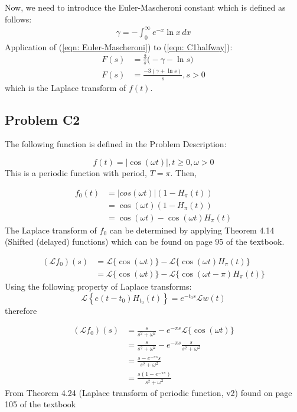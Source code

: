 \documentclass[a4paper,10pt,reqno]{amsart}
\numberwithin{equation}{section}
\newcommand{\lap}{\mathscr{L}}
\begin{document}
Now, we need to introduce the Euler-Mascheroni constant which is defined as follows:
\begin{align}
\gamma = -\int_{0}^{\infty} e^{-x} \ln x \,dx \label{eqn: Euler-Mascheroni}
\end{align}
Application of (\ref{eqn: Euler-Mascheroni}) to (\ref{eqn: C1halfway}):
\begin{align}
F(s) &= \frac{3}{s} \bigg( -\gamma - \ln s \bigg) \nonumber \\
F(s) &= \frac{-3(\gamma + \ln s)}{s}, s>0 \label{eqn: C1final}
\end{align}
which is the Laplace transform of $f(t)$.


\subsection{Problem C2}\label{sec:c2}

The following function is defined in the Problem Description:

\begin{equation}
    f(t) = |\cos(\omega t)|, t \geq 0, \omega > 0
\end{equation}
This is a periodic function with period, $T = \pi$. Then, 

\begin{align}
f_0(t) &= |cos(\omega t)|(1 - H_\pi(t)) \\
&= \cos(\omega t)(1 - H_\pi(t)) \\
&= \cos(\omega t) - \cos(\omega t)H_\pi(t)
\end{align}
The Laplace transform of $f_0$ can be determined by applying Theorem 4.14 (Shifted (delayed) functions) which can be found on page 95 of the textbook.

\begin{align}
(\lap f_0)(s) &= \lap\{\cos(\omega t)\} - \lap\{\cos(\omega t)H_\pi(t)\} \\
&= \lap\{\cos(\omega t)\} - \lap\{\cos(\omega t - \pi)H_\pi(t)\}
\end{align}
Using the following property of Laplace transforms:
\begin{equation}
    \lap\left\{e(t - t_0)H_{t_0}(t)\right\} = e^{-t_0 s}\lap{w(t)}
\end{equation}
therefore

\begin{align}
     (\lap f_0)(s) &= \frac{s}{s^2 + \omega^2} - e^{-\pi s}\lap\{\cos(\omega t)\} \\
     &= \frac{s}{s^2 + \omega^2} - e^{-\pi s}\frac{s}{s^2 + \omega^2} \\
     &= \frac{s - e^{-\pi s}s}{s^2 + \omega^2} \\
     &= \frac{s(1 - e^{-\pi s})}{s^2 + \omega^2}
\end{align}
From Theorem 4.24 (Laplace transform of periodic function, v2) found on page 105 of the textbook
\end{document}
